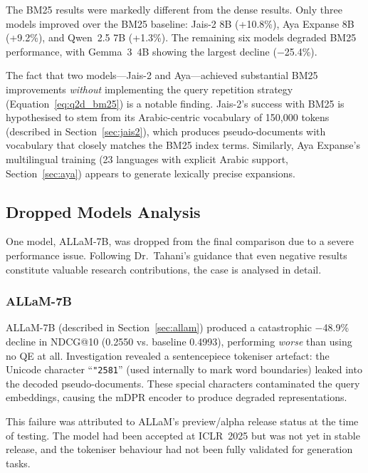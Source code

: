 The BM25 results were markedly different from the dense results. Only three models improved over the BM25 baseline: Jais-2 8B (+10.8\%), Aya Expanse 8B (+9.2\%), and Qwen~2.5 7B (+1.3\%). The remaining six models degraded BM25 performance, with Gemma~3~4B showing the largest decline ($-$25.4\%).

The fact that two models---Jais-2 and Aya---achieved substantial BM25 improvements \emph{without} implementing the query repetition strategy (Equation~\ref{eq:q2d_bm25}) is a notable finding. Jais-2's success with BM25 is hypothesised to stem from its Arabic-centric vocabulary of 150,000 tokens (described in Section~\ref{sec:jais2}), which produces pseudo-documents with vocabulary that closely matches the BM25 index terms. Similarly, Aya Expanse's multilingual training (23 languages with explicit Arabic support, Section~\ref{sec:aya}) appears to generate lexically precise expansions.

\subsection{Dropped Models Analysis}
\label{sec:res_dropped}

One model, ALLaM-7B, was dropped from the final comparison due to a severe performance issue. Following Dr.~Tahani's guidance that even negative results constitute valuable research contributions, the case is analysed in detail.

\subsubsection{ALLaM-7B}
\label{sec:res_allam}

ALLaM-7B (described in Section~\ref{sec:allam}) produced a catastrophic $-$48.9\% decline in NDCG@10 (0.2550 vs. baseline 0.4993), performing \emph{worse} than using no QE at all. Investigation revealed a sentencepiece tokeniser artefact: the Unicode character ``\texttt{\char"2581}'' (used internally to mark word boundaries) leaked into the decoded pseudo-documents. These special characters contaminated the query embeddings, causing the mDPR encoder to produce degraded representations.

This failure was attributed to ALLaM's preview/alpha release status at the time of testing. The model had been accepted at ICLR~2025 \cite{bari2025allam} but was not yet in stable release, and the tokeniser behaviour had not been fully validated for generation tasks.

